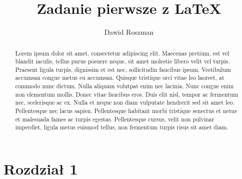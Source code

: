 \documentclass[12pt,a4paper]{article}
\title{Zadanie pierwsze z \LaTeX}
\author{Dawid Roszman}
\begin{document}
	\maketitle
	
	\begin{abstract}
		Lorem ipsum dolor sit amet, consectetur adipiscing elit. Maecenas pretium, est vel blandit iaculis, tellus purus posuere neque, sit amet molestie libero velit vel turpis. Praesent ligula turpis, dignissim et est nec, sollicitudin faucibus ipsum. Vestibulum accumsan congue metus eu accumsan. Quisque tristique orci vitae leo laoreet, at commodo nunc dictum. Nulla aliquam volutpat enim nec lacinia. Nunc congue enim non elementum mollis. Donec vitae faucibus eros. Duis elit nisl, tempor ac fermentum nec, scelerisque ac ex. Nulla et neque non diam vulputate hendrerit sed sit amet leo. Pellentesque nec lacus sapien. Pellentesque habitant morbi tristique senectus et netus et malesuada fames ac turpis egestas. Pellentesque cursus, velit non pulvinar imperdiet, ligula metus euismod tellus, non fermentum turpis risus sit amet diam.
	\end{abstract}
	
	\newpage
	
	\tableofcontents
	
	\newpage
	
	\part {Rozdział 1}
\end{document}
